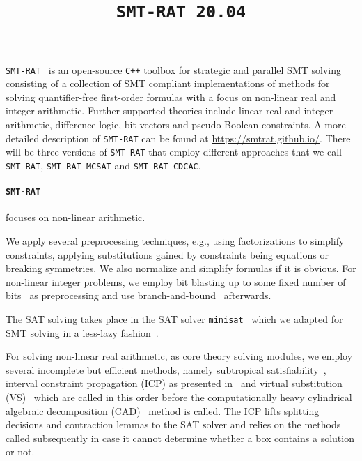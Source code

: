 \documentclass{article}
\title{\texttt{SMT-RAT 20.04}}
\begin{document}
\maketitle

\texttt{SMT-RAT}~\cite{Corzilius2015} is an open-source \texttt{C++} toolbox for strategic and parallel SMT solving consisting of a collection of SMT compliant implementations of methods for
solving quantifier-free first-order formulas with a focus on non-linear real and integer arithmetic.
Further supported theories include linear real and integer arithmetic, difference logic, bit-vectors and pseudo-Boolean constraints.
A more detailed description of \texttt{SMT-RAT} can be found at \href{https://smtrat.github.io/}{\color{blue}https://smtrat.github.io/}.
There will be three versions of \texttt{SMT-RAT} that employ different approaches that we call \texttt{SMT-RAT}, \texttt{SMT-RAT-MCSAT} and \texttt{SMT-RAT-CDCAC}.



\paragraph{\texttt{SMT-RAT}} focuses on non-linear arithmetic.

We apply several preprocessing techniques, e.g., using factorizations to simplify constraints, applying substitutions gained by constraints being equations or breaking symmetries. We also normalize and simplify formulas if it is obvious. For non-linear integer problems, we employ bit blasting up to some fixed number of bits~\cite{kruger2015bitvectors} as preprocessing and use branch-and-bound~\cite{Kremer2016} afterwards.

The SAT solving takes place in the SAT solver \texttt{minisat}~\cite{Een2003} which we adapted for SMT solving in a less-lazy fashion~\cite{sebastiani2007lazy}.

For solving non-linear real arithmetic, as core theory solving modules, we employ several incomplete but efficient methods, namely subtropical satisfiability~\cite{Fontaine2017}, interval constraint propagation (ICP) as presented in~\cite{GGIGSC10} and virtual substitution (VS)~\cite{Article_Corzilius_FCT2011} which are called in this order before the computationally heavy cylindrical algebraic decomposition (CAD)~\cite{Loup2013} method is called. The ICP lifts splitting decisions and contraction lemmas to the SAT solver and relies on the methods called subsequently in case it cannot determine whether a box contains a solution or not. 
\end{document}
